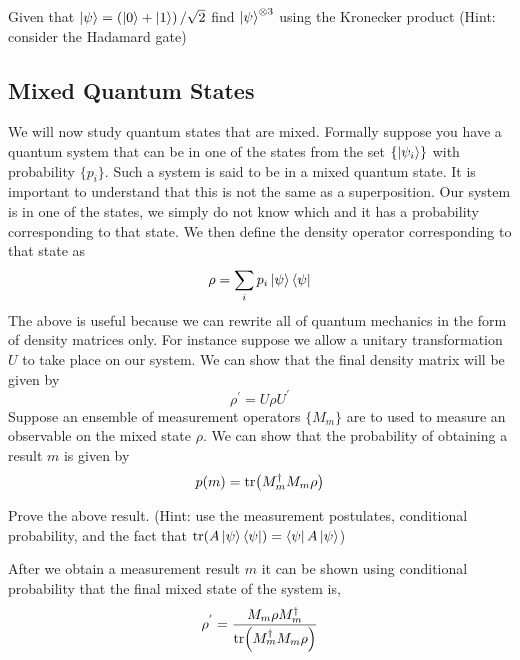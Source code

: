 \begin{exercise}
Given that $\ket{\psi} = \left(\ket{0} + \ket{1} \right)/\sqrt{2}$ find $\ket{\psi}^{\otimes 3}$ using the Kronecker product (Hint: consider the Hadamard gate)
\end{exercise}

\subsection{Mixed Quantum States}

We will now study quantum states that are mixed. Formally suppose you have a quantum system that can be in one of the states from the set $\{\ket{\psi_i}\}$ with probability $\{p_i\}$. Such a system is said to be in a mixed quantum state. It is important to understand that this is not the same as a superposition. Our system is in one of the states, we simply do not know which and it has a probability corresponding to that state.
We then define the density operator corresponding to that state as 
$$\rho = \sum_i p_i \ket{\psi}\bra{\psi} $$
The above is useful because we can rewrite all of quantum mechanics in the form of density matrices only. For instance suppose we allow a unitary transformation $U$ to take place on our system. We can show that the final density matrix will be given by 
$$ \rho^{'} = U\rho U^{'}$$
Suppose an ensemble of measurement operators $\{ M_m \}$ are to used to measure an observable on the mixed state $\rho$. We can show that the probability of obtaining a result $m$ is given by 
$$ p(m) = \tr(M_m^{\dagger}M_m \rho)$$
\begin{exercise}
Prove the above result. (Hint: use the measurement postulates, conditional probability, and the fact that $\tr(A\ket{\psi}\bra{\psi}) = \bra{\psi}A\ket{\psi}$)
\end{exercise}

After we obtain a measurement result $m$ it can be shown using conditional probability that the final mixed state of the system is,
$$ \rho^{'} = \frac{M_m \rho M_m^{\dagger}}{\tr(M_m^{\dagger}M_m \rho)}$$

